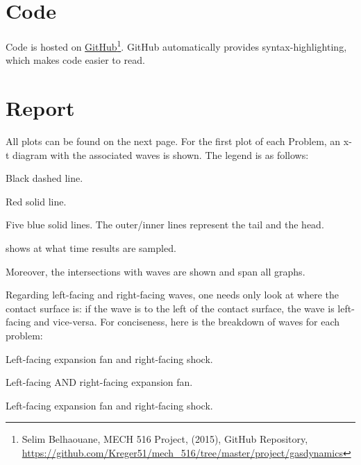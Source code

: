 \documentclass{SelimArticle}
\begin{document}
\mytitlepage
\section{Code}
Code is hosted on \href{https://github.com/Kreger51/mech_516/tree/master/project/gasdynamics}{GitHub}\footnote{Selim Belhaouane, MECH 516 Project, (2015), GitHub Repository, \url{https://github.com/Kreger51/mech_516/tree/master/project/gasdynamics}}. GitHub automatically provides syntax-highlighting, which makes code easier to read. 

\section{Report}
All plots can be found on the next page. For the first plot of each Problem, an x-t diagram with the associated waves is shown. The legend is as follows:
\begin{description}[nolistsep]
    \item [Contact Surface:] Black dashed line.
    \item [Shockwave:] Red solid line.
    \item [Rarefaction Wave:] Five blue solid lines. The outer/inner lines represent the tail and the head. 
    \item [The green horizontal dashed line] shows at what time results are sampled.
\end{description}  
Moreover, the intersections with waves are shown and span all graphs. 

Regarding left-facing and right-facing waves, one needs only look at where the contact surface is: if the wave is to the left of the contact surface, the wave is left-facing and vice-versa. For conciseness, here is the breakdown of waves for each problem:
\begin{description}[nolistsep]
    \item [Problem 1:] Left-facing expansion fan and right-facing shock.
    \item [Problem 2:] Left-facing AND right-facing expansion fan.
    \item [Problem 3:] Left-facing expansion fan and right-facing shock.
\end{description}
\newpage


% 
% 
% 
\end{document}
